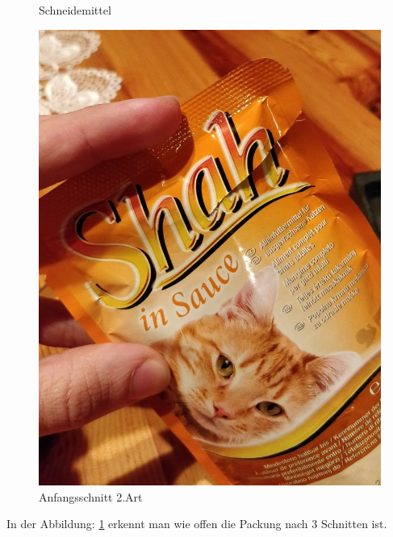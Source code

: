 \begin{figure}[H]
\begin{minipage}[hbt]{.3\linewidth}
      \caption{Schneidemittel}
   \end{minipage}
   \hspace{.4\linewidth}%
   \begin{minipage}[hbt]{.3\linewidth} %
      \includegraphics[width=\linewidth]{Bilder/Schneideversuch_2.Art/Anfangsschnitt}
      \caption{Anfangsschnitt 2.Art}
      \label{Nach 3 Schnitten}
   \end{minipage}
\end{figure}

In der Abbildung: \ref{Nach 3 Schnitten} erkennt man wie offen die Packung nach 3 Schnitten ist.


